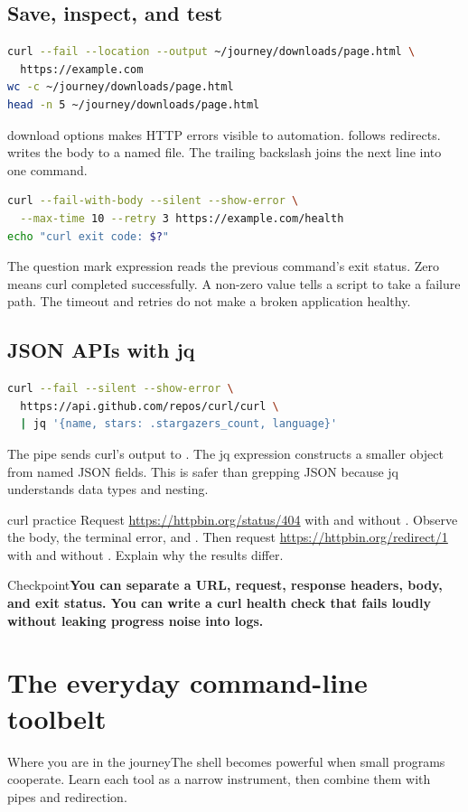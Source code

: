 \documentclass[11pt,a4paper,openany]{book}
\newcommand{\command}[1]{\texttt{\small\detokenize{#1}}}
\newcommand{\lesson}[1]{\begin{mentalbox}{Where you are in the journey}#1\end{mentalbox}}
\newcommand{\checkpoint}[1]{\begin{mentalbox}{Checkpoint}\textbf{#1}\end{mentalbox}}
\begin{document}
\section{Save, inspect, and test}
\begin{lstlisting}[language=bash]
curl --fail --location --output ~/journey/downloads/page.html \
  https://example.com
wc -c ~/journey/downloads/page.html
head -n 5 ~/journey/downloads/page.html
\end{lstlisting}
\begin{explainbox}{download options}
\command{--fail} makes HTTP errors visible to automation. \command{--location} follows redirects. \command{--output path} writes the body to a named file. The trailing backslash joins the next line into one command.
\end{explainbox}
\begin{lstlisting}[language=bash]
curl --fail-with-body --silent --show-error \
  --max-time 10 --retry 3 https://example.com/health
echo "curl exit code: $?"
\end{lstlisting}
The question mark expression reads the previous command's exit status. Zero means curl completed successfully. A non-zero value tells a script to take a failure path. The timeout and retries do not make a broken application healthy.
\section{JSON APIs with jq}
\begin{lstlisting}[language=bash]
curl --fail --silent --show-error \
  https://api.github.com/repos/curl/curl \
  | jq '{name, stars: .stargazers_count, language}'
\end{lstlisting}
The pipe sends curl's output to \command{jq}. The jq expression constructs a smaller object from named JSON fields. This is safer than grepping JSON because jq understands data types and nesting.
\begin{trybox}{curl practice}
Request \url{https://httpbin.org/status/404} with and without \command{-f}. Observe the body, the terminal error, and \command{\$?}. Then request \url{https://httpbin.org/redirect/1} with and without \command{--location}. Explain why the results differ.
\end{trybox}
\checkpoint{You can separate a URL, request, response headers, body, and exit status. You can write a curl health check that fails loudly without leaking progress noise into logs.}
\chapter{The everyday command-line toolbelt}
\lesson{The shell becomes powerful when small programs cooperate. Learn each tool as a narrow instrument, then combine them with pipes and redirection.}
\end{document}
